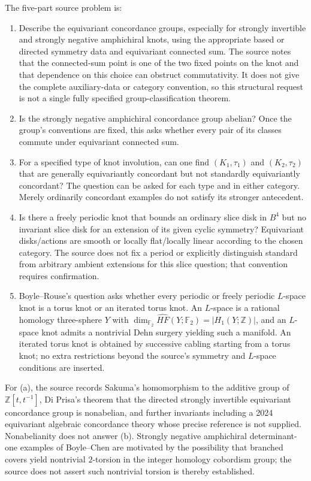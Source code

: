 \documentclass[11pt]{article}
\newcommand{\Z}{\mathbb{Z}}
\newcommand{\F}{\mathbb{F}}
\begin{document}
The five-part source problem is:
\begin{enumerate}
\item Describe the equivariant concordance groups, especially for strongly invertible and strongly negative amphichiral knots, using the appropriate based or directed symmetry data and equivariant connected sum. The source notes that the connected-sum point is one of the two fixed points on the knot and that dependence on this choice can obstruct commutativity. It does not give the complete auxiliary-data or category convention, so this structural request is not a single fully specified group-classification theorem.
\item Is the strongly negative amphichiral concordance group abelian? Once the group's conventions are fixed, this asks whether every pair of its classes commute under equivariant connected sum.
\item For a specified type of knot involution, can one find $(K_1,\tau_1)$ and $(K_2,\tau_2)$ that are generally equivariantly concordant but not standardly equivariantly concordant? The question can be asked for each type and in either category. Merely ordinarily concordant examples do not satisfy its stronger antecedent.
\item Is there a freely periodic knot that bounds an ordinary slice disk in $B^4$ but no invariant slice disk for an extension of its given cyclic symmetry? Equivariant disks/actions are smooth or locally flat/locally linear according to the chosen category. The source does not fix a period or explicitly distinguish standard from arbitrary ambient extensions for this slice question; that convention requires confirmation.
\item Boyle--Rouse's question asks whether every periodic or freely periodic $L$-space knot is a torus knot or an iterated torus knot. An $L$-space is a rational homology three-sphere $Y$ with $\dim_{\F_2}\widehat{HF}(Y;\F_2)=|H_1(Y;\Z)|$, and an $L$-space knot admits a nontrivial Dehn surgery yielding such a manifold. An iterated torus knot is obtained by successive cabling starting from a torus knot; no extra restrictions beyond the source's symmetry and $L$-space conditions are inserted.
\end{enumerate}

For (a), the source records Sakuma's homomorphism to the additive group of $\Z[t,t^{-1}]$, Di Prisa's theorem that the directed strongly invertible equivariant concordance group is nonabelian, and further invariants including a 2024 equivariant algebraic concordance theory whose precise reference is not supplied. Nonabelianity does not answer (b). Strongly negative amphichiral determinant-one examples of Boyle--Chen are motivated by the possibility that branched covers yield nontrivial $2$-torsion in the integer homology cobordism group; the source does not assert such nontrivial torsion is thereby established.
\end{document}
